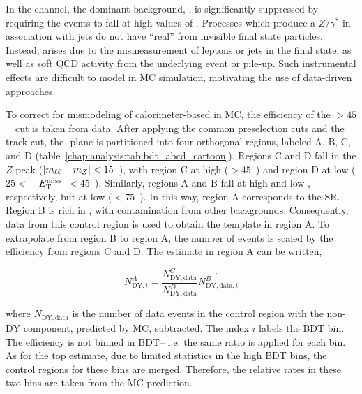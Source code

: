 
In the \eemm channel, the dominant background, \ZDY, is significantly
suppressed by requiring the events to fall at high values of
\etmiss. Processes which produce a $Z/\gamma^{*}$ in association with
jets do not have ``real'' \etmiss from invisible final state
particles. Instead, \etmiss arises due to the mismeasurement of
leptons or jets in the final state, as well as soft QCD activity from the underlying
event or pile-up. Such instrumental effects are difficult to model in
MC simulation, motivating the use of data-driven approaches. 

To correct for mismodeling of calorimeter-based \etmiss in \ZDY MC, the
efficiency of the \calomet$>45$~\gev~cut is taken from data. After
applying the common preselection cuts and the track \etmiss cut, the
\mll-\etmiss plane is partitioned into four orthogonal regions, labeled A, B, C,
and D (table~\ref{chap:analysis:tab:bdt_abcd_cartoon}). Regions C and D fall in the $Z$ peak ($|m_{\ell\ell} -
m_Z| < 15$~\gev), with region C at high \etmiss ($>45$~\gev) and
region D at low \etmiss ($25 < $~\gev~$E_{\mathrm{T}}^{\rm miss}$~$ <
45$~\gev). Similarly, regions A and B fall at high and low \etmiss,
respectively, but at low \mll (\mll$< 75$~\gev). In this way, region A
corresponds to the \eemm SR. Region B is rich in \ZDY, with
 contamination from other backgrounds. Consequently,
data from this control region is used to obtain the \ZDY template in
region A. To extrapolate from region B to region A, the number of
events is scaled by the \etmiss efficiency from regions C and D. The
estimate in region A can be written,

\begin{equation}
\label{chap:analysis:equation:dy_est1}
N_{\mathrm{DY},i}^A = \frac{N_{\mathrm{DY},\mathrm{data}}^{C}}{N_{\mathrm{DY},\mathrm{data}}^{D}}\dot{N_{\mathrm{DY},\mathrm{data},i}^{B}}
\end{equation}

\noindent
where $N_{\mathrm{DY},\mathrm{data}}$ is the number of data events in the control
region with the non-$\mathrm{DY}$ component, predicted by MC,
subtracted. The index $i$ labels the BDT bin. The \etmiss efficiency
is not binned in BDT-- i.e. the same ratio is applied for each bin. As
for the top estimate, due to limited statistics in the high BDT bins,
the control regions for these bins are merged. Therefore, the relative
rates in these two bins are taken from the MC prediction. 

